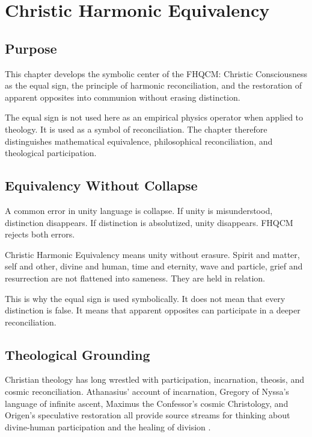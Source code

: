 \chapter{Christic Harmonic Equivalency}

\section{Purpose}

This chapter develops the symbolic center of the FHQCM: Christic Consciousness as the equal sign, the principle of harmonic reconciliation, and the restoration of apparent opposites into communion without erasing distinction.

The equal sign is not used here as an empirical physics operator when applied to theology. It is used as a symbol of reconciliation. The chapter therefore distinguishes mathematical equivalence, philosophical reconciliation, and theological participation.


\section{Equivalency Without Collapse}

A common error in unity language is collapse. If unity is misunderstood, distinction disappears. If distinction is absolutized, unity disappears. FHQCM rejects both errors.

Christic Harmonic Equivalency means unity without erasure. Spirit and matter, self and other, divine and human, time and eternity, wave and particle, grief and resurrection are not flattened into sameness. They are held in relation.

This is why the equal sign is used symbolically. It does not mean that every distinction is false. It means that apparent opposites can participate in a deeper reconciliation.

\section{Theological Grounding}

Christian theology has long wrestled with participation, incarnation, theosis, and cosmic reconciliation. Athanasius' account of incarnation, Gregory of Nyssa's language of infinite ascent, Maximus the Confessor's cosmic Christology, and Origen's speculative restoration all provide source streams for thinking about divine-human participation and the healing of division \cite{athanasius2011Incarnation,gregory2012LifeMoses,maximus1985CosmicMystery,origen2018FirstPrinciples}.

